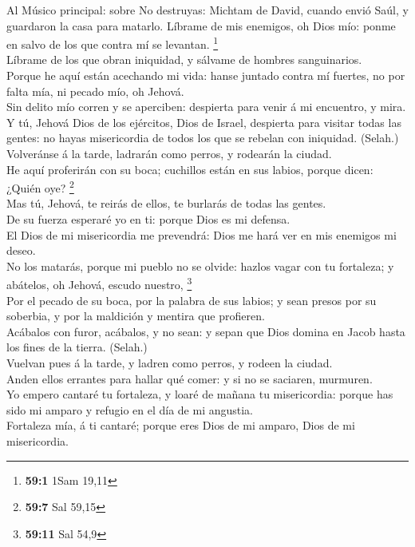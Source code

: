 Al Músico principal: sobre No destruyas: Michtam de
David, cuando envió Saúl, y guardaron la casa para matarlo. Líbrame de
mis enemigos, oh Dios mío: ponme en salvo de los que contra mí se
levantan. \footnote{\textbf{59:1} 1Sam 19,11}\\
 Líbrame de los que obran iniquidad, y sálvame de hombres
sanguinarios.\\
 Porque he aquí están acechando mi vida: hanse juntado
contra mí fuertes, no por falta mía, ni pecado mío, oh Jehová.\\
 Sin delito mío corren y se aperciben: despierta para
venir á mi encuentro, y mira.\\
 Y tú, Jehová Dios de los ejércitos, Dios de Israel,
despierta para visitar todas las gentes: no hayas misericordia de todos
los que se rebelan con iniquidad. (Selah.)\\
 Volveránse á la tarde, ladrarán como perros, y rodearán
la ciudad.\\
 He aquí proferirán con su boca; cuchillos están en sus
labios, porque dicen: ¿Quién oye? \footnote{\textbf{59:7} Sal 59,15}\\
 Mas tú, Jehová, te reirás de ellos, te burlarás de todas
las gentes.\\
 De su fuerza esperaré yo en ti: porque Dios es mi
defensa.\\
 El Dios de mi misericordia me prevendrá: Dios me hará
ver en mis enemigos mi deseo.\\
 No los matarás, porque mi pueblo no se olvide: hazlos
vagar con tu fortaleza; y abátelos, oh Jehová, escudo nuestro,
\footnote{\textbf{59:11} Sal 54,9}\\
 Por el pecado de su boca, por la palabra de sus labios;
y sean presos por su soberbia, y por la maldición y mentira que
profieren.\\
 Acábalos con furor, acábalos, y no sean: y sepan que
Dios domina en Jacob hasta los fines de la tierra. (Selah.)\\
 Vuelvan pues á la tarde, y ladren como perros, y rodeen
la ciudad.\\
 Anden ellos errantes para hallar qué comer: y si no se
saciaren, murmuren.\\
 Yo empero cantaré tu fortaleza, y loaré de mañana tu
misericordia: porque has sido mi amparo y refugio en el día de mi
angustia.\\
 Fortaleza mía, á ti cantaré; porque eres Dios de mi
amparo, Dios de mi misericordia.

